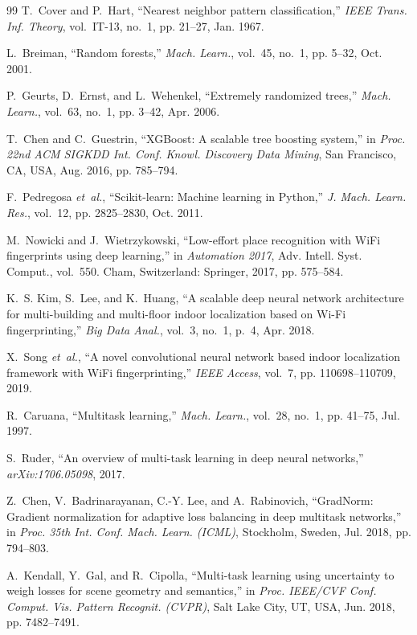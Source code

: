 \documentclass[conference]{IEEEtran}
\begin{document}
\begin{thebibliography}{99}
T.~Cover and P.~Hart, ``Nearest neighbor pattern classification,'' \emph{IEEE Trans. Inf. Theory}, vol.~IT-13, no.~1, pp. 21--27, Jan. 1967.

L.~Breiman, ``Random forests,'' \emph{Mach. Learn.}, vol.~45, no.~1, pp. 5--32, Oct. 2001.

P.~Geurts, D.~Ernst, and L.~Wehenkel, ``Extremely randomized trees,'' \emph{Mach. Learn.}, vol.~63, no.~1, pp. 3--42, Apr. 2006.

T.~Chen and C.~Guestrin, ``XGBoost: A scalable tree boosting system,'' in \emph{Proc. 22nd ACM SIGKDD Int. Conf. Knowl. Discovery Data Mining}, San Francisco, CA, USA, Aug. 2016, pp. 785--794.

F.~Pedregosa \emph{et~al.}, ``Scikit-learn: Machine learning in Python,'' \emph{J. Mach. Learn. Res.}, vol.~12, pp. 2825--2830, Oct. 2011.

M.~Nowicki and J.~Wietrzykowski, ``Low-effort place recognition with WiFi fingerprints using deep learning,'' in \emph{Automation 2017}, Adv. Intell. Syst. Comput., vol.~550. Cham, Switzerland: Springer, 2017, pp. 575--584.

K.~S. Kim, S.~Lee, and K.~Huang, ``A scalable deep neural network architecture for multi-building and multi-floor indoor localization based on Wi-Fi fingerprinting,'' \emph{Big Data Anal.}, vol.~3, no.~1, p.~4, Apr. 2018.

X.~Song \emph{et~al.}, ``A novel convolutional neural network based indoor localization framework with WiFi fingerprinting,'' \emph{IEEE Access}, vol.~7, pp. 110698--110709, 2019.

R.~Caruana, ``Multitask learning,'' \emph{Mach. Learn.}, vol.~28, no.~1, pp. 41--75, Jul. 1997.

S.~Ruder, ``An overview of multi-task learning in deep neural networks,'' \emph{arXiv:1706.05098}, 2017.

Z.~Chen, V.~Badrinarayanan, C.-Y. Lee, and A.~Rabinovich, ``GradNorm: Gradient normalization for adaptive loss balancing in deep multitask networks,'' in \emph{Proc. 35th Int. Conf. Mach. Learn. (ICML)}, Stockholm, Sweden, Jul. 2018, pp. 794--803.

A.~Kendall, Y.~Gal, and R.~Cipolla, ``Multi-task learning using uncertainty to weigh losses for scene geometry and semantics,'' in \emph{Proc. IEEE/CVF Conf. Comput. Vis. Pattern Recognit. (CVPR)}, Salt Lake City, UT, USA, Jun. 2018, pp. 7482--7491.


\end{thebibliography}
\end{document}
